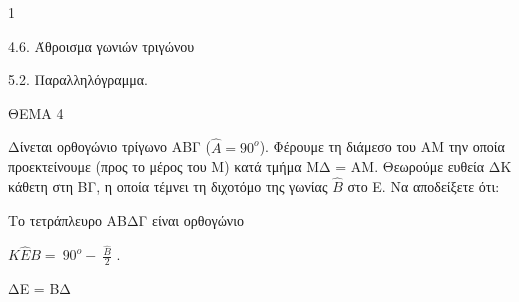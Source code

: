 \begin{ylh}{1}
    \item 4.6. Άθροισμα γωνιών τριγώνου
    \item 5.2. Παραλληλόγραμμα.
\end{ylh}

ΘΕΜΑ 4

Δίνεται ορθογώνιο τρίγωνο ΑΒΓ ($\widehat{Α} = 90^{ο}$). Φέρουμε τη διάμεσο του ΑΜ την οποία προεκτείνουμε (προς το μέρος του Μ) κατά τμήμα ΜΔ = ΑΜ. Θεωρούμε ευθεία ΔΚ κάθετη στη ΒΓ, η οποία τέμνει τη διχοτόμο της γωνίας $\widehat{Β}$ στο Ε. Να αποδείξετε ότι:

\begin{alist}
\item Το τετράπλευρο ΑΒΔΓ είναι ορθογώνιο 

\item $Κ\widehat{Ε}Β = \ 90^{ο} - \ \frac{\widehat{Β}}{2}$ . 

\item ΔΕ = ΒΔ 


\end{alist}
